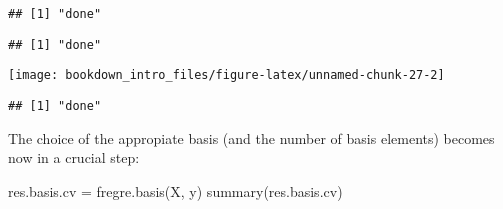 \documentclass[
]{book}
\newenvironment{Shaded}{\begin{snugshade}}{\end{snugshade}}
\newcommand{\FunctionTok}[1]{\textcolor[rgb]{0.00,0.00,0.00}{#1}}
\newcommand{\NormalTok}[1]{#1}
\newcommand{\OtherTok}[1]{\textcolor[rgb]{0.56,0.35,0.01}{#1}}
\newcommand{\SpecialCharTok}[1]{\textcolor[rgb]{0.00,0.00,0.00}{#1}}
\begin{document}
\begin{verbatim}
## [1] "done"
\end{verbatim}

\begin{Shaded}
\end{Shaded}

\begin{verbatim}
## [1] "done"
\end{verbatim}

\begin{Shaded}
\end{Shaded}

\begin{center}\texttt{[image: bookdown\_intro\_files/figure-latex/unnamed-chunk-27-2]} \end{center}

\begin{verbatim}
## [1] "done"
\end{verbatim}

The choice of the appropiate basis (and the number of basis elements) becomes now in a crucial step:

\begin{Shaded}
\begin{Highlighting}[]
\NormalTok{res.basis.cv }\OtherTok{=} \FunctionTok{fregre.basis}\NormalTok{(X, y)}
\FunctionTok{summary}\NormalTok{(res.basis.cv)}
\end{Highlighting}
\end{Shaded}
\end{document}
